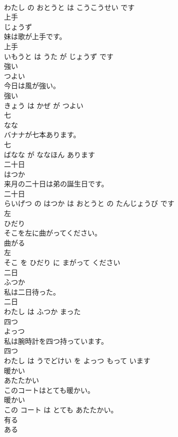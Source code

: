 \documentclass[8pt]{extreport}
\begin{document}
\begin{CJK}{UTF8}{min}
\\	わたし の おとうと は こうこうせい です			
\\	上手	
\\	じょうず			
\\	妹は歌が上手です。	
\\	上手 
\\	いもうと は うた が じょうず です			
\\	強い	
\\	つよい			
\\	今日は風が強い。	
\\	強い 
\\	きょう は かぜ が つよい			
\\	七	
\\	なな			
\\	バナナが七本あります。	
\\	七 
\\	ばなな が ななほん あります			
\\	二十日	
\\	はつか			
\\	来月の二十日は弟の誕生日です。	
\\	二十日 
\\	らいげつ の はつか は おとうと の たんじょうび です			
\\	左	
\\	ひだり			
\\	そこを左に曲がってください。	
\\	曲がる 
\\	左 
\\	そこ を ひだり に まがって ください			
\\	二日	
\\	ふつか			
\\	私は二日待った。	
\\	二日 
\\	わたし は ふつか まった			
\\	四つ	
\\	よっつ			
\\	私は腕時計を四つ持っています。	
\\	四つ 
\\	わたし は うでどけい を よっつ もって います			
\\	暖かい	
\\	あたたかい			
\\	このコートはとても暖かい。	
\\	暖かい 
\\	この コート は とても あたたかい。			
\\	有る	
\\	ある			

\end{CJK}
\end{document}
